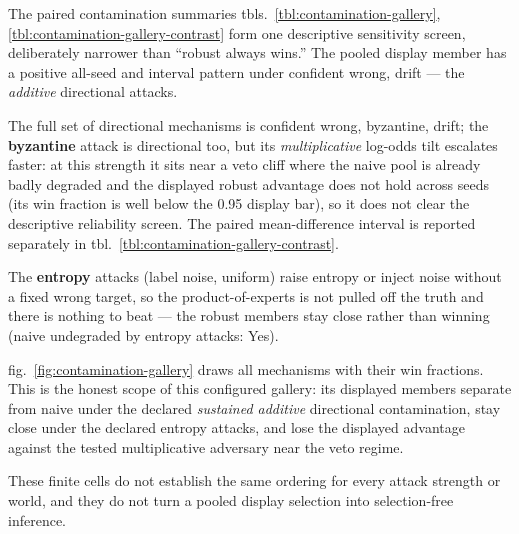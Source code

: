 \documentclass[
  english,
]{article}
\theoremstyle{plain}
\theoremstyle{definition}
\theoremstyle{remark}
\theoremstyle{definition}
\begin{document}
The paired contamination summaries
tbls.~\ref{tbl:contamination-gallery}, \ref{tbl:contamination-gallery-contrast}
form one descriptive sensitivity screen, deliberately narrower than
``robust always wins.'' The pooled display member has a positive
all-seed and interval pattern under confident wrong, drift --- the
\emph{additive} directional attacks.

The full set of directional mechanisms is confident wrong, byzantine,
drift; the \textbf{byzantine} attack is directional too, but its
\emph{multiplicative} log-odds tilt escalates faster: at this strength
it sits near a veto cliff where the naive pool is already badly degraded
and the displayed robust advantage does not hold across seeds (its win
fraction is well below the 0.95 display bar), so it does not clear the
descriptive reliability screen. The paired mean-difference interval is
reported separately in tbl.~\ref{tbl:contamination-gallery-contrast}.

The \textbf{entropy} attacks (label noise, uniform) raise entropy or
inject noise without a fixed wrong target, so the product-of-experts is
not pulled off the truth and there is nothing to beat --- the robust
members stay close rather than winning (naive undegraded by entropy
attacks: Yes).

fig.~\ref{fig:contamination-gallery} draws all mechanisms with their win
fractions. This is the honest scope of this configured gallery: its
displayed members separate from naive under the declared \emph{sustained
additive} directional contamination, stay close under the declared
entropy attacks, and lose the displayed advantage against the tested
multiplicative adversary near the veto regime.

These finite cells do not establish the same ordering for every attack
strength or world, and they do not turn a pooled display selection into
selection-free inference.
\end{document}
